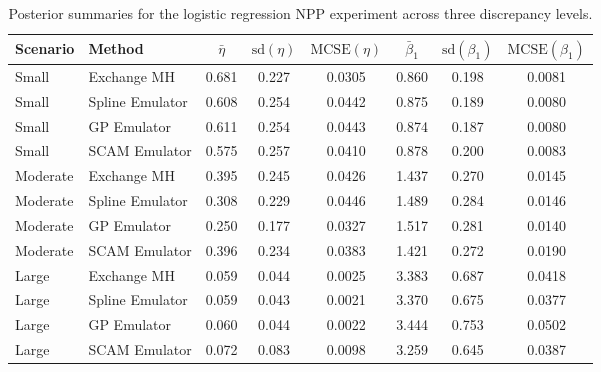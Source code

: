 \begin{table}[ht]
  \centering
  \begin{tabular}{llcccccc}
  \hline
  Scenario & Method & $\bar{\eta}$ & $\mathrm{sd}(\eta)$ & $\mathrm{MCSE}(\eta)$ & $\bar{\beta}_1$ & $\mathrm{sd}(\beta_1)$ & $\mathrm{MCSE}(\beta_1)$ \\
  \hline
  Small & Exchange MH & 0.681 & 0.227 & 0.0305 & 0.860 & 0.198 & 0.0081 \\
  Small & Spline Emulator & 0.608 & 0.254 & 0.0442 & 0.875 & 0.189 & 0.0080 \\
  Small & GP Emulator & 0.611 & 0.254 & 0.0443 & 0.874 & 0.187 & 0.0080 \\
  Small & SCAM Emulator & 0.575 & 0.257 & 0.0410 & 0.878 & 0.200 & 0.0083 \\
  \hline
  Moderate & Exchange MH & 0.395 & 0.245 & 0.0426 & 1.437 & 0.270 & 0.0145 \\
  Moderate & Spline Emulator & 0.308 & 0.229 & 0.0446 & 1.489 & 0.284 & 0.0146 \\
  Moderate & GP Emulator & 0.250 & 0.177 & 0.0327 & 1.517 & 0.281 & 0.0140 \\
  Moderate & SCAM Emulator & 0.396 & 0.234 & 0.0383 & 1.421 & 0.272 & 0.0190 \\
  \hline
  Large & Exchange MH & 0.059 & 0.044 & 0.0025 & 3.383 & 0.687 & 0.0418 \\
  Large & Spline Emulator & 0.059 & 0.043 & 0.0021 & 3.370 & 0.675 & 0.0377 \\
  Large & GP Emulator & 0.060 & 0.044 & 0.0022 & 3.444 & 0.753 & 0.0502 \\
  Large & SCAM Emulator & 0.072 & 0.083 & 0.0098 & 3.259 & 0.645 & 0.0387 \\
  \hline
  \end{tabular}
  \caption{Posterior summaries for the logistic regression NPP experiment across three discrepancy levels.}
  \label{tab:logistic-surrogate-summaries}
\end{table}
